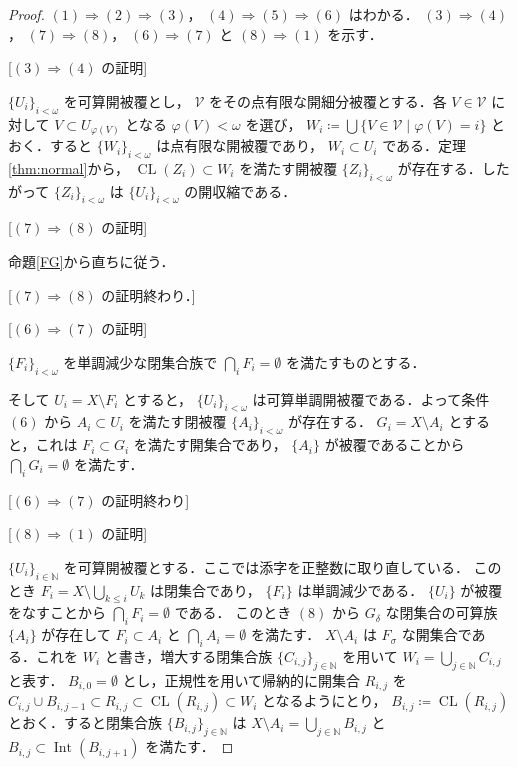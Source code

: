 \documentclass[leqno, 12pt]{ltjsarticle}
\newcommand{\To}{\Longrightarrow}
\newcommand{\nn}{\mathbb{N}}
\DeclareMathOperator{\cl}{CL}
\DeclareMathOperator{\nai}{Int}
\begin{document}
\begin{proof}
$(1)\To (2)\To (3)$，
$(4)\To (5)\To (6)$
はわかる．
$(3)\To (4)$，
$(7)\To (8)$，
$(6)\To (7)$
と
$(8)\To (1)$
を示す．

[$(3)\To (4)$
の証明]

$\{U_{i}\}_{i<\omega}$
を可算開被覆とし，
$\mathcal{V}$
をその点有限な開細分被覆とする．各
$V\in\mathcal{V}$
に対して
$V\subset U_{\varphi(V)}$
となる
$\varphi(V)<\omega$
を選び，
$W_{i}\coloneqq\bigcup\{V\in\mathcal{V} \mid \varphi(V)=i\}$
とおく．すると
$\{W_{i}\}_{i<\omega}$
は点有限な開被覆であり，
$W_{i}\subset U_{i}$
である．定理\ref{thm:normal}から，
$\cl(Z_{i})\subset W_{i}$
を満たす開被覆
$\{Z_{i}\}_{i<\omega}$
が存在する．したがって
$\{Z_{i}\}_{i<\omega}$
は
$\{U_{i}\}_{i<\omega}$
の開収縮である．

[$(7)\To (8)$
の証明]

命題\ref{FG}から直ちに従う．

[$(7)\To (8)$
の証明終わり．]

[$(6)\To (7)$
の証明]

$\{F_{i}\}_{i< \omega}$
を単調減少な閉集合族で
$\bigcap_{i} F_{i}=\emptyset$
を満たすものとする．

そして
$U_{i}=X\setminus F_{i}$
とすると，
$\{U_{i}\}_{i< \omega}$
は可算単調開被覆である．よって条件
$(6)$
から
$A_{i}\subset U_{i}$
を満たす閉被覆
$\{A_{i}\}_{i< \omega}$
が存在する．
$G_{i}=X\setminus A_{i}$
とすると，これは
$F_{i}\subset G_{i}$
を満たす開集合であり，
$\{A_{i}\}$
が被覆であることから
$\bigcap_{i}G_{i}=\emptyset$
を満たす．


[$(6)\To (7)$
の証明終わり]


[$(8)\To (1)$
の証明]

$\{U_{i}\}_{i\in\nn}$
を可算開被覆とする．ここでは添字を正整数に取り直している．
このとき
$F_{i}=X\setminus \bigcup_{k\le i}U_{k}$
は閉集合であり，
$\{F_{i}\}$
は単調減少である．
$\{U_{i}\}$
が被覆をなすことから
$\bigcap_{i}F_{i}=\emptyset$
である．
このとき
$(8)$
から
$G_{\delta}$
な閉集合の可算族
$\{A_{i}\}$
が存在して
$F_{i}\subset A_{i}$
と
$\bigcap_{i}A_{i}=\emptyset$
を満たす．
$X\setminus A_{i}$
は
$F_{\sigma}$
な開集合である．これを
$W_{i}$
と書き，増大する閉集合族
$\{C_{i,j}\}_{j\in\nn}$
を用いて
$W_{i}=\bigcup_{j\in\nn}C_{i,j}$
と表す．
$B_{i,0}=\emptyset$
とし，正規性を用いて帰納的に開集合
$R_{i,j}$
を
$C_{i,j}\cup B_{i,j-1}\subset R_{i,j}\subset\cl(R_{i,j})\subset W_{i}$
となるようにとり，
$B_{i,j}\coloneqq\cl(R_{i,j})$
とおく．すると閉集合族
$\{B_{i, j}\}_{j\in\nn}$
は
$X\setminus A_{i}=\bigcup_{j\in\nn}B_{i,j}$
と
$B_{i,j}\subset\nai(B_{i,j+1})$
を満たす．


\end{proof}
\end{document}
